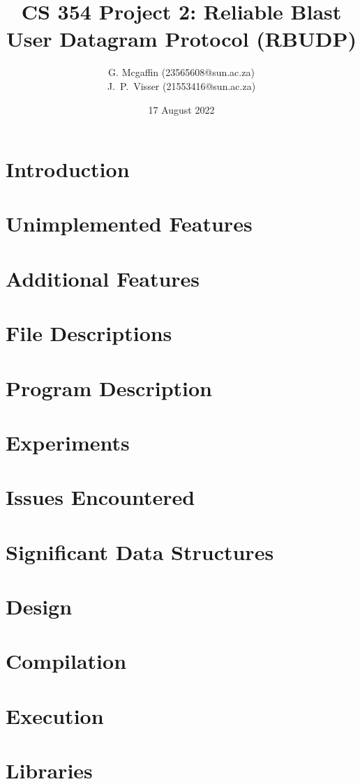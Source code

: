 \documentclass[10pt, a4paper]{article}
\title{CS 354 Project 2: Reliable Blast User Datagram Protocol (RBUDP)}
\author{G. Mcgaffin (23565608@sun.ac.za) \\
        J.\ P.\ Visser (21553416@sun.ac.za)}
\date{17 August 2022}
\begin{document}
\maketitle

\section{Introduction}

\section{Unimplemented Features}

\section{Additional Features}

\section{File Descriptions}

\section{Program Description}

\section{Experiments}

\section{Issues Encountered}

\section{Significant Data Structures}

\section{Design}

\section{Compilation}

\section{Execution}

\section{Libraries}
\end{document}
